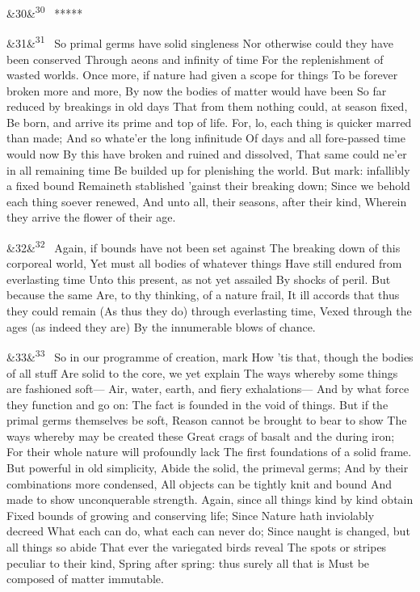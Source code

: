 \documentclass[12pt]{article}
\newcommand{\para}[1][]{\par\noindent\ifx&#1&\else\textsuperscript{\footnotesize #1}~\fi}
\begin{document}
\para[30] *****

\para[31] So primal germs have solid singleness Nor otherwise could they have been conserved Through aeons and infinity of time For the replenishment of wasted worlds. Once more, if nature had given a scope for things To be forever broken more and more, By now the bodies of matter would have been So far reduced by breakings in old days That from them nothing could, at season fixed, Be born, and arrive its prime and top of life. For, lo, each thing is quicker marred than made; And so whate'er the long infinitude Of days and all fore-passed time would now By this have broken and ruined and dissolved, That same could ne'er in all remaining time Be builded up for plenishing the world. But mark: infallibly a fixed bound Remaineth stablished 'gainst their breaking down; Since we behold each thing soever renewed, And unto all, their seasons, after their kind, Wherein they arrive the flower of their age.

\para[32] Again, if bounds have not been set against The breaking down of this corporeal world, Yet must all bodies of whatever things Have still endured from everlasting time Unto this present, as not yet assailed By shocks of peril. But because the same Are, to thy thinking, of a nature frail, It ill accords that thus they could remain (As thus they do) through everlasting time, Vexed through the ages (as indeed they are) By the innumerable blows of chance.

\para[33] So in our programme of creation, mark How 'tis that, though the bodies of all stuff Are solid to the core, we yet explain The ways whereby some things are fashioned soft--- Air, water, earth, and fiery exhalations--- And by what force they function and go on: The fact is founded in the void of things. But if the primal germs themselves be soft, Reason cannot be brought to bear to show The ways whereby may be created these Great crags of basalt and the during iron; For their whole nature will profoundly lack The first foundations of a solid frame. But powerful in old simplicity, Abide the solid, the primeval germs; And by their combinations more condensed, All objects can be tightly knit and bound And made to show unconquerable strength. Again, since all things kind by kind obtain Fixed bounds of growing and conserving life; Since Nature hath inviolably decreed What each can do, what each can never do; Since naught is changed, but all things so abide That ever the variegated birds reveal The spots or stripes peculiar to their kind, Spring after spring: thus surely all that is Must be composed of matter immutable.
\end{document}
